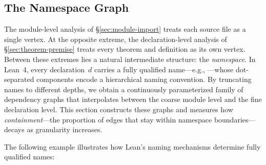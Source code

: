 \subsection{The Namespace Graph}
\label{sec:namespace-graph}

The module-level analysis of \S\ref{sec:module-import} treats each source file as a single vertex. At the opposite extreme, the declaration-level analysis of \S\ref{sec:theorem-premise} treats every theorem and definition as its own vertex. Between these extremes lies a natural intermediate structure: the \emph{namespace}. In Lean~4, every declaration~$d$ carries a fully qualified name---e.g., ---whose dot-separated components encode a hierarchical naming convention. By truncating names to different depths, we obtain a continuously parameterized family of dependency graphs that interpolates between the coarse module level and the fine declaration level. This section constructs these graphs and measures how \emph{containment}---the proportion of edges that stay within namespace boundaries---decays as granularity increases.

The following example illustrates how Lean's naming mechanisms determine fully qualified names:

